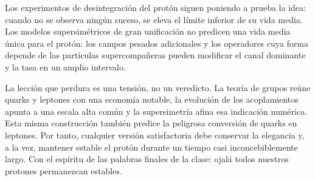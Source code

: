 Los experimentos de desintegración del protón siguen poniendo a prueba la idea: cuando no se observa ningún suceso, se eleva el límite inferior de su vida media. Los modelos supersimétricos de gran unificación no predicen una vida media única para el protón: los campos pesados adicionales y los operadores cuya forma depende de las partículas supercompañeras pueden modificar el canal dominante y la tasa en un amplio intervalo.


La lección que perdura es una tensión, no un veredicto. La teoría de grupos reúne quarks y leptones con una economía notable, la evolución de los acoplamientos apunta a una escala alta común y la supersimetría afina esa indicación numérica. Esta misma construcción también predice la peligrosa conversión de quarks en leptones. Por tanto, cualquier versión satisfactoria debe conservar la elegancia y, a la vez, mantener estable el protón durante un tiempo casi inconcebiblemente largo. Con el espíritu de las palabras finales de la clase: ojalá todos nuestros protones permanezcan estables.
